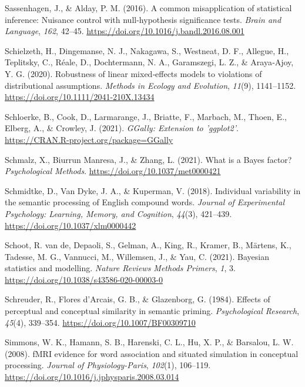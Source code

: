 \documentclass[
  12pt,
  man,floatsintext]{apa7}
\newlength{\cslhangindent}
\newlength{\cslentryspacingunit} %
\newenvironment{CSLReferences}[2] %
 {%
  \setlength{\parindent}{0pt}
  \ifodd #1
  \let\oldpar\par
  \def\par{\hangindent=\cslhangindent\oldpar}
  \fi
  \setlength{\parskip}{#2\cslentryspacingunit}
 }%
 {}
\begin{document}
\begin{CSLReferences}{1}{0}
\leavevmode{}%
Sassenhagen, J., \& Alday, P. M. (2016). A common misapplication of statistical inference: {Nuisance} control with null-hypothesis significance tests. \emph{Brain and Language}, \emph{162}, 42--45. \url{https://doi.org/10.1016/j.bandl.2016.08.001}

\leavevmode{}%
Schielzeth, H., Dingemanse, N. J., Nakagawa, S., Westneat, D. F., Allegue, H., Teplitsky, C., Réale, D., Dochtermann, N. A., Garamszegi, L. Z., \& Araya‐Ajoy, Y. G. (2020). Robustness of linear mixed‐effects models to violations of distributional assumptions. \emph{Methods in Ecology and Evolution}, \emph{11}(9), 1141--1152. \url{https://doi.org/10.1111/2041-210X.13434}

\leavevmode{}%
Schloerke, B., Cook, D., Larmarange, J., Briatte, F., Marbach, M., Thoen, E., Elberg, A., \& Crowley, J. (2021). \emph{GGally: Extension to 'ggplot2'}. \url{https://CRAN.R-project.org/package=GGally}

\leavevmode{}%
Schmalz, X., Biurrun Manresa, J., \& Zhang, L. (2021). What is a {Bayes} factor? \emph{Psychological Methods}. \url{https://doi.org/10.1037/met0000421}

\leavevmode{}%
Schmidtke, D., Van Dyke, J. A., \& Kuperman, V. (2018). Individual variability in the semantic processing of {English} compound words. \emph{Journal of Experimental Psychology: Learning, Memory, and Cognition}, \emph{44}(3), 421--439. \url{https://doi.org/10.1037/xlm0000442}

\leavevmode{}%
Schoot, R. van de, Depaoli, S., Gelman, A., King, R., Kramer, B., Märtens, K., Tadesse, M. G., Vannucci, M., Willemsen, J., \& Yau, C. (2021). Bayesian statistics and modelling. \emph{Nature Reviews Methods Primers}, \emph{1}, 3. \url{https://doi.org/10.1038/s43586-020-00003-0}

\leavevmode{}%
Schreuder, R., Flores d'Arcais, G. B., \& Glazenborg, G. (1984). Effects of perceptual and conceptual similarity in semantic priming. \emph{Psychological Research}, \emph{45}(4), 339--354. \url{https://doi.org/10.1007/BF00309710}

\leavevmode{}%
Simmons, W. K., Hamann, S. B., Harenski, C. L., Hu, X. P., \& Barsalou, L. W. (2008). {fMRI} evidence for word association and situated simulation in conceptual processing. \emph{Journal of Physiology-Paris}, \emph{102}(1), 106--119. \url{https://doi.org/10.1016/j.jphysparis.2008.03.014}


\end{CSLReferences}
\end{document}
